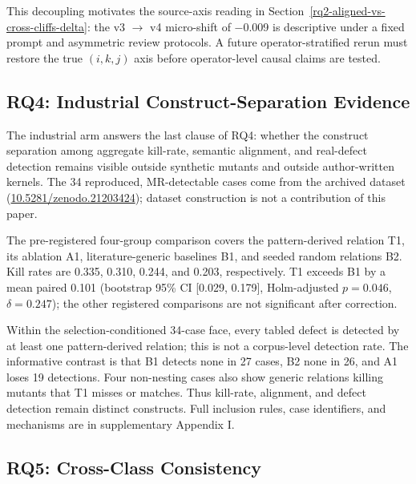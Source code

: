 \documentclass[review,12pt,authoryear]{elsarticle}
\newcounter{none}                   %
\begin{document}
This decoupling motivates the source-axis reading in
Section~\ref{rq2-aligned-vs-cross-cliffs-delta}: the v3 $\to$ v4
micro-shift of −0.009 is descriptive under a fixed prompt and asymmetric
review protocols. A future operator-stratified rerun must restore the
true \((i,k,j)\) axis before operator-level causal claims are tested.

\subsection{RQ4: Industrial Construct-Separation Evidence}\label{rq4-industrial-construct-separation}

The industrial arm answers the last clause of RQ4: whether the
construct separation among aggregate kill-rate, semantic alignment, and
real-defect detection remains visible outside synthetic mutants and
outside author-written kernels. The 34 reproduced, MR-detectable cases
come from the archived dataset \citep{defect4mr2026}
(\href{https://doi.org/10.5281/zenodo.21203424}{10.5281/zenodo.21203424});
dataset construction is not a contribution of this paper.

The pre-registered four-group comparison covers the pattern-derived
relation T1, its ablation A1, literature-generic baselines B1, and seeded
random relations B2. Kill rates are 0.335, 0.310, 0.244, and 0.203,
respectively. T1 exceeds B1 by a mean paired 0.101 (bootstrap 95\% CI
[0.029, 0.179], Holm-adjusted \(p=0.046\), \(\delta=0.247\)); the other
registered comparisons are not significant after correction.

Within the selection-conditioned 34-case face, every tabled defect is
detected by at least one pattern-derived relation; this is not a
corpus-level detection rate. The informative contrast is that B1
detects none in 27 cases, B2 none in 26, and A1 loses 19 detections.
Four non-nesting cases also show generic relations killing mutants that
T1 misses or matches. Thus kill-rate, alignment, and defect detection
remain distinct constructs. Full inclusion rules, case identifiers, and
mechanisms are in supplementary Appendix I.

\subsection{RQ5: Cross-Class Consistency}\label{rq3-cross-class-consistency-and-friedman}
\end{document}
